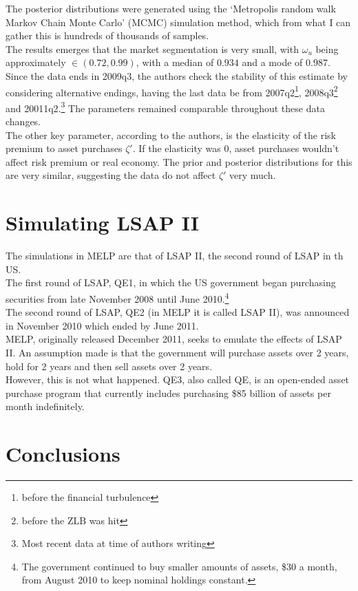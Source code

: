\documentclass[notitlepage,12pt]{report}
\newcommand{\raiseinf}{\raisebox{0.31ex}{$\infty$}}
\begin{document}
\begin{appendices}
	The posterior distributions were generated using the `Metropolis random walk Markov Chain Monte Carlo' (MCMC) simulation method\cite[p.23]{chen_macroeconomic_2011}, which from what I can gather this is hundreds of thousands of samples.\\
	The results emerges that the market segmentation is very small, with \(\omega_u\) being approximately \(\in(0.72,0.99)\), with a median of \(0.934\) and a mode of \(0.987\). Since the data ends in 2009q3, the authors check the stability of this estimate by considering alternative endings, having the last data be from 2007q2\footnote{before the financial turbulence}, 2008q3\footnote{before the ZLB was hit} and 20011q2.\footnote{Most recent data at time of authors writing} The parameters remained comparable throughout these data changes.\\
	The other key parameter, according to the authors, is the elasticity of the risk premium to asset purchases \(\zeta'\). If the elasticity was \(0\), asset purchases wouldn't affect risk premium or real economy. The prior and posterior distributions for this are very similar, suggesting the data do not affect \(\zeta'\) very much.
	
	\section{Simulating LSAP II}
	
	The simulations in MELP are that of LSAP II, the second round of LSAP in th US.\\
	
	The first round of LSAP, QE1, in which the US government began purchasing securities from late November 2008 until June 2010.\footnote{The government continued to buy smaller amounts of assets, \$30 a month, from August 2010 to keep nominal holdings constant.}\\
	The second round of LSAP, QE2 (in MELP it is called LSAP II), was announced in November 2010 which ended by June 2011.\\
	MELP, originally released December 2011, seeks to emulate the effects of LSAP II. An assumption made is that the government will purchase assets over 2 years, hold for 2 years and then sell assets over 2 years.\\
	However, this is not what happened. QE3, also called QE\raiseinf, is an open-ended asset purchase program that currently includes purchasing \$85 billion of assets per month indefinitely.
	
	\section{Conclusions}
	

\end{appendices}
\end{document}
